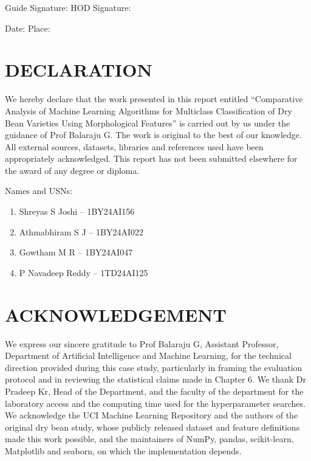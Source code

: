 \vspace{2.2cm}
\noindent
Guide Signature: \blank \hspace{0.6cm} HOD Signature: \blank

\vspace{1.4cm}
\noindent
Date: \blank \hspace{2.1cm} Place: \blank

\chapter*{DECLARATION}
\thispagestyle{frontmatter}

We hereby declare that the work presented in this report entitled ``Comparative
Analysis of Machine Learning Algorithms for Multiclass Classification of Dry Bean
Varieties Using Morphological Features'' is carried out by us under the guidance
of Prof Balaraju G. The work is original to the best of our knowledge. All external
sources, datasets, libraries and references used have been appropriately
acknowledged. This report has not been submitted elsewhere for the award of any
degree or diploma.

\vspace{1.4cm}
\noindent Names and USNs:
\begin{enumerate}[label=\arabic*.,leftmargin=1.6em,itemsep=0.35cm]
  \item Shreyas S Joshi -- 1BY24AI156
  \item Athmabhiram S J -- 1BY24AI022
  \item Gowtham M R -- 1BY24AI047
  \item P Navadeep Reddy -- 1TD24AI125
\end{enumerate}

\chapter*{ACKNOWLEDGEMENT}
\thispagestyle{frontmatter}

We express our sincere gratitude to Prof Balaraju G, Assistant Professor,
Department of Artificial Intelligence and Machine Learning, for the technical
direction provided during this case study, particularly in framing the evaluation
protocol and in reviewing the statistical claims made in Chapter 6. We thank
Dr Pradeep Kr, Head of the Department, and the faculty of the department for the
laboratory access and the computing time used for the hyperparameter searches. We acknowledge the UCI
Machine Learning Repository and the authors of the original dry bean study,
whose publicly released dataset and feature definitions made this work possible,
and the maintainers of NumPy, pandas, scikit-learn, Matplotlib and seaborn, on
which the implementation depends.

